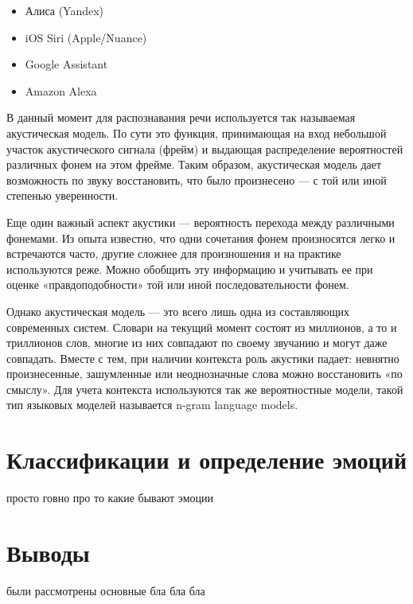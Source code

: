 \begin{itemize}
	\item Алиса (Yandex)
	\item iOS Siri (Apple/Nuance)
	\item Google Assistant
	\item Amazon Alexa
\end{itemize}

В данный момент для распознавания речи используется так называемая акустическая модель. По сути 
это функция, принимающая на вход небольшой участок акустического сигнала (фрейм) и выдающая распределение вероятностей различных фонем на этом фрейме. 
Таким образом, акустическая модель дает возможность по звуку восстановить, что было произнесено — с той или иной степенью уверенности.

Еще один важный аспект акустики — вероятность перехода между различными фонемами. 
Из опыта известно, что одни сочетания фонем произносятся легко и встречаются часто, другие сложнее для произношения и на практике используются реже.
Можно обобщить эту информацию и учитывать ее при оценке «правдоподобности» той или иной последовательности фонем.

Однако акустическая модель — это всего лишь одна из составляющих современных систем. Словари на текущий момент состоят из 
миллионов, а то и триллионов слов, многие из них совпадают по своему звучанию и могут даже совпадать. 
Вместе с тем, при наличии контекста роль акустики падает: невнятно произнесенные, зашумленные или неоднозначные слова можно восстановить «по смыслу».
Для учета контекста используются так же вероятностные модели, такой тип языковых моделей называется n-gram language models. 

\section{Классификации и определение эмоций}

просто говно про то какие бывают эмоции 

\section{Выводы}

были рассмотрены основные бла бла бла 

